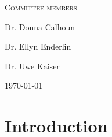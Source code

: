 \documentclass[11pt,a4paper]{article}
\begin{document}
\begin{titlepage}
\begin{center}
	\vfill
	\end{center} 
	\begin{center}
	    \textsc{\large Committee members}\\ [0.3cm]
	    
	\end{center}
	
	\hspace{6cm}Dr. Donna Calhoun \par
	\hspace{6cm}Dr. Ellyn Enderlin \par 
	\hspace{6cm}Dr. Uwe Kaiser
	
	\vfill\vfill\vfill %
	
	\center 
	{\large\today} %
	
	
	 
	
	\vfill %
	
    \end{titlepage}
	
	\section{Introduction}
	
\end{document}
